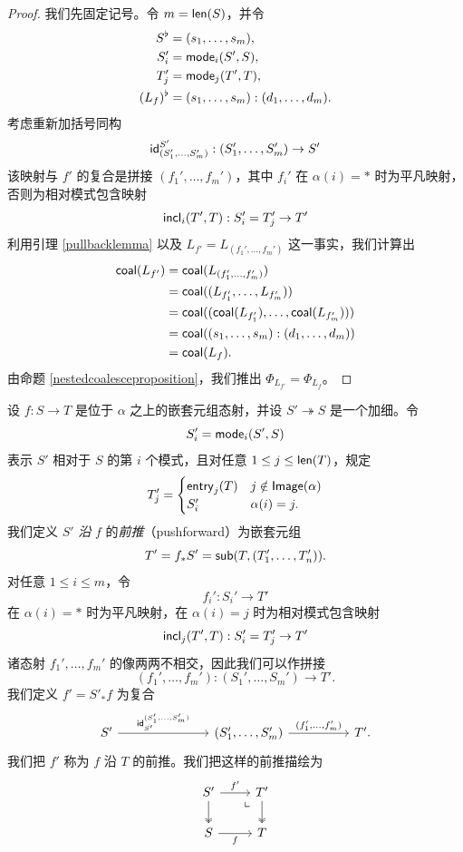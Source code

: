 \begin{proof}
    我们先固定记号。令 $m = \mathsf{len}(S)$，并令
    \begin{align*}
    S^\flat & = (s_1,\dots,s_m),\\
    S_i' & = \mathsf{mode}_i(S',S),\\
    T_j' & = \mathsf{mode}_j(T',T),\\
    (L_f)^\flat & = (s_1,\dots,s_m):(d_1,\dots,d_m).
    \end{align*}
    考虑重新加括号同构
    \[
    \mathsf{id}_{(S_1',\dots,S_m')}^{S'}:(S_1',\dots,S_m') \to S'
    \]
    该映射与 $f'$ 的复合是拼接 $(f_1',\dots,f_m')$，其中 $f_i'$ 在 $\alpha(i) = *$ 时为平凡映射，否则为相对模式包含映射
    \[
    \mathsf{incl}_i(T',T):S_i' = T_j' \to T'
    \]
    利用引理 \ref{pullbacklemma} 以及 $L_{f'} = L_{(f_1',\dots,f_m')}$ 这一事实，我们计算出
    \begin{align*}
    \mathsf{coal}(L_{f'}) & = \mathsf{coal}(L_{(f_1',\dots,f_m')})\\
    & = \mathsf{coal}((L_{f_1'},\dots,L_{f_m'}))\\
    & = \mathsf{coal}((\mathsf{coal}(L_{f_1'}),\dots,\mathsf{coal}(L_{f_m'}) ) )\\
    & = \mathsf{coal}((s_1,\dots,s_m):(d_1,\dots,d_m))\\
    & = \mathsf{coal}(L_f).
    \end{align*}
    由命题 \ref{nestedcoalesceproposition}，我们推出 $\Phi_{L_{f'}} = \Phi_{L_f}$。
\end{proof}

\begin{construction}[前推]
    设 $f:S \to T$ 是位于 $\alpha$ 之上的嵌套元组态射，并设 $S' \twoheadrightarrow S$ 是一个加细。令
    \[
    S_i' = \mathsf{mode}_i(S',S)
    \]
    表示 $S'$ 相对于 $S$ 的第 $i$ 个模式，且对任意 $1 \leq j \leq \mathsf{len}(T)$，规定
    \[
    T_j' = 
    \begin{cases} 
    \mathsf{entry}_j(T) & j \notin \mathsf{Image}(\alpha) \\
    S'_i & \alpha(i) = j.
    \end{cases}
    \]
    我们定义 $S'$ {\it 沿} $f$ 的{\it 前推}（pushforward）为嵌套元组
    \[
    T' = f_*S' = \mathsf{sub}(T,(T_1',\dots,T_n')).
    \]
    对任意 $1 \leq i \leq m$，令
    \[
    f_i':S_i' \to T' 
    \]
    在 $\alpha(i) = *$ 时为平凡映射，在 $\alpha(i) = j$ 时为相对模式包含映射
    \[
    \mathsf{incl}_j(T',T):S_i' = T_j' \to T'
    \]
    诸态射 $f_1',\dots,f_m'$ 的像两两不相交，因此我们可以作拼接
    \[
    (f_1',\dots,f_m'):(S_1',\dots,S_m') \to T'.
    \]
    我们定义 $f' = S'_*f$ 为复合
    \[ \begin{tikzcd}
    S' \ar[rrr,"\id_{S'}^{(S_1'{,}\dots{,}S_m')}"] & & &  (S_1',\dots,S_m') \ar[rr,"(f_1'{,}\dots{,}f_m')"] & & T'.
    \end{tikzcd} \]
    我们把 $f'$ 称为 $f$ 沿 $T$ 的前推。我们把这样的前推描绘为
    \[ \begin{tikzcd} 
    S' \ar[r,"f'"] \ar[d,two heads] & \arrow[dl, phantom, "\llcorner", very near start]T' \ar[d,two heads] \\
    S \ar[r,swap,"f"] & T\\
    \end{tikzcd} \]
\end{construction}

